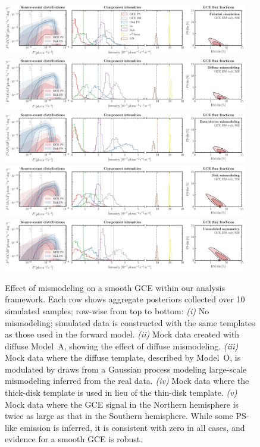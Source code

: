 \documentclass[prd,aps,10pt,nofootinbib,twocolumn,superscriptaddress,preprintnumbers,balancelastpage,longbibliography,floatfix]{revtex4-2}
\begin{document}
%
\begin{figure}
\centering
\includegraphics[width=0.95\textwidth]{plots/sim_sbi_dm_agg.pdf}
\includegraphics[width=0.95\textwidth]{plots/sim_sbi_modelA_dm.pdf}
\includegraphics[width=0.95\textwidth]{plots/sim_sbi_dm_mismo.pdf}
\includegraphics[width=0.95\textwidth]{plots/sim_sbi_thick_disk_mm_dm.pdf}
\includegraphics[width=0.95\textwidth]{plots/sim_sbi_dm_asym.pdf}
\caption{Effect of mismodeling on a smooth GCE within our analysis framework. Each row shows aggregate posteriors collected over 10 simulated samples; row-wise from top to bottom: \emph{(i)} No mismodeling; simulated data is constructed with the same templates as those used in the forward model. \emph{(ii)} Mock data created with diffuse {Model~A}, showing the effect of diffuse mismodeling. \emph{(iii)} Mock data where the diffuse template, described by {Model~O}, is modulated by draws from a Gaussian process modeling large-scale mismodeling inferred from the real \Fermi data. \emph{(iv)} Mock data where the thick-disk template is used in lieu of the thin-disk template. \emph{(v)} Mock data where the GCE signal in the Northern hemisphere is twice as large as that in the Southern hemisphere. While some PS-like emission is inferred, it is consistent with zero in all cases, and evidence for a smooth GCE is robust.}
\label{fig:sim_sbi_mismo}
\end{figure}
%
\end{document}
